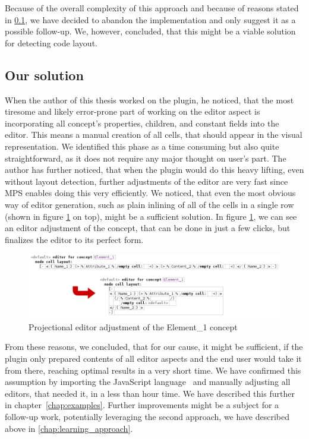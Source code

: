 Because of the overall complexity of this approach and because of reasons stated in \ref{chap:editor_solution}, we have decided to abandon the implementation and only suggest it as a possible follow-up.
We, however, concluded, that this might be a viable solution for detecting code layout.

\subsection{Our solution}
\label{chap:editor_solution}

When the author of this thesis worked on the plugin, he noticed, that the most tiresome and likely error-prone part of working on the editor aspect is incorporating all concept's properties, children, and constant fields into the editor.
This means a manual creation of all cells, that should appear in the visual representation.
We identified this phase as a time consuming but also quite straightforward, as it does not require any major thought on user's part.
The author has further noticed, that when the plugin would do this heavy lifting, even without layout detection, further adjustments of the editor are very fast since MPS enables doing this very efficiently.
We noticed, that even the most obvious way of editor generation, such as plain inlining of all of the cells in a single row (shown in figure \ref{fig:editor_adjustment} on top), might be a sufficient solution.
In figure \ref{fig:editor_adjustment}, we can see an editor adjustment of the  concept, that can be done in just a few clicks, but finalizes the editor to its perfect form.
\\

\begin{figure}[h]
	\centering
	\includegraphics[width=\textwidth]{./img/editor_adjustment.png}
	\caption{Projectional editor adjustment of the Element{\_}1 concept}
	\label{fig:editor_adjustment}
\end{figure}

From these reasons, we concluded, that for our cause, it might be sufficient, if the plugin only prepared contents of all editor aspects and the end user would take it from there, reaching optimal results in a very short time.
We have confirmed this assumption by importing the JavaScript language~\cite{javascript} and manually adjusting all editors, that needed it, in a less than hour time.
We have described this further in chapter~\ref{chap:examples}.
Further improvements might be a subject for a follow-up work, potentially leveraging the second approach, we have described above in \ref{chap:learning_approach}.

